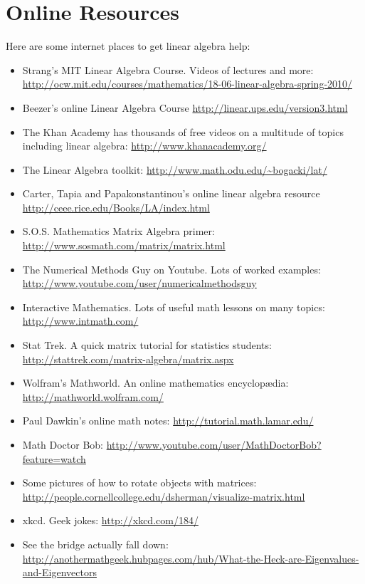 \chapter{Online Resources}\label{othersources}

Here are some  internet places to get linear algebra help:

\begin{itemize}
\item
Strang's MIT Linear Algebra Course. Videos of lectures and more:
\url{http://ocw.mit.edu/courses/mathematics/18-06-linear-algebra-spring-2010/}
\item Beezer's online Linear Algebra Course
\url{http://linear.ups.edu/version3.html}
\item The Khan Academy has thousands of free videos on a multitude of topics including linear algebra:
\url{http://www.khanacademy.org/}
\item The Linear Algebra toolkit:
\url{http://www.math.odu.edu/~bogacki/lat/}
\item Carter, Tapia and Papakonstantinou's online linear algebra resource
\url{http://ceee.rice.edu/Books/LA/index.html}
\item
S.O.S. Mathematics Matrix Algebra primer:
\url{http://www.sosmath.com/matrix/matrix.html}
\item The Numerical Methods Guy on Youtube. Lots of worked examples:
\url{http://www.youtube.com/user/numericalmethodsguy}
\item Interactive Mathematics. Lots of useful math lessons on many topics:
\url{http://www.intmath.com/}
\item Stat Trek. A quick matrix tutorial for statistics students:
\url{http://stattrek.com/matrix-algebra/matrix.aspx}
\item Wolfram's Mathworld. An online mathematics encyclop\ae dia:
\url{http://mathworld.wolfram.com/}
\item Paul Dawkin's online math notes:
\url{http://tutorial.math.lamar.edu/}
\item Math Doctor Bob:
\url{http://www.youtube.com/user/MathDoctorBob?feature=watch}
\item Some pictures of how to rotate objects with matrices:
\url{http://people.cornellcollege.edu/dsherman/visualize-matrix.html}
\item xkcd. Geek jokes:
\url{http://xkcd.com/184/}
\item See the bridge actually fall down:
\url{http://anothermathgeek.hubpages.com/hub/What-the-Heck-are-Eigenvalues-and-Eigenvectors}
\end{itemize}

\newpage